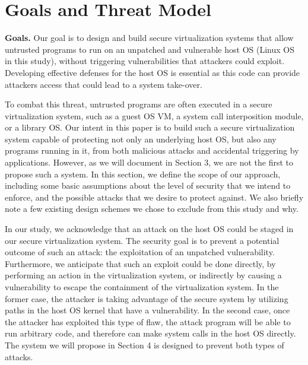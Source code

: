 \section{Goals and Threat Model}
\label{sec.motivation-and-background}

\textbf{Goals.}
Our goal is to design and build secure virtualization systems that allow
untrusted programs to run on an unpatched and vulnerable host OS (Linux OS in
 this study), without triggering vulnerabilities that attackers could exploit.
 Developing effective defenses for the host OS is essential as this code
 can provide attackers access that could lead to a system take-over.

To combat this threat, untrusted programs are often executed in a secure
 virtualization system, such as a guest OS VM, a system call interposition
 module, or a library OS. Our intent in this paper is to
build such a secure virtualization system capable of protecting not only
an underlying host OS, but also any programs running in it, from both malicious attacks
and accidental triggering by applications. However, as we will document
in Section 3, we are not the first to propose such a system.
In this section, we define the scope of our approach, including some basic
assumptions about the level of security that we intend to enforce,
and the possible attacks that we desire to protect against. We also briefly note
a few existing design schemes we chose to exclude from this study and why.

In our study, we acknowledge that an attack on the host OS could be staged in our secure
virtualization system. The security goal is to prevent a potential outcome of such
an attack: the exploitation of an unpatched vulnerability. Furthermore, we
anticipate that such an exploit could be done directly, by performing an action in the
virtualization system, or indirectly by causing a vulnerability to escape the
containment of the virtualization system.  In the former case, the attacker is
taking advantage of the secure system by utilizing paths in the host OS kernel
that have a vulnerability. In the second case, once the attacker has exploited
this type of flaw, the attack program will be able to run arbitrary code, and
therefore can make system calls in the host OS directly. The system we will propose
in Section 4 is designed to prevent both types of attacks.

